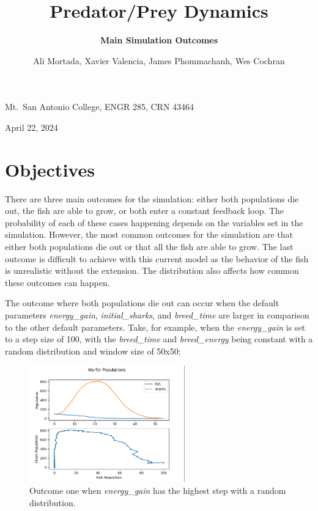 \documentclass[12pt]{iopart} %
\begin{document}
\title{Predator/Prey Dynamics}
\author{Ali Mortada, Xavier Valencia, James Phommachanh, Wes Cochran}
\vspace{10pt}
\begin{indented}
  \item[]Mt.~San Antonio College, ENGR 285, CRN 43464
  \item[]April 22, 2024
\end{indented}
\newpage

\section{Objectives}

\subtitle{\textbf{Main Simulation Outcomes}}

There are three main outcomes for the simulation: either both populations die out, the fish are able to grow, or both enter a constant feedback loop. 
The probability of each of these cases happening depends on the variables set in the simulation. 
However, the most common outcomes for the simulation are that either both populations die out or that all the fish are able to grow. 
The last outcome is difficult to achieve with this current model as the behavior of the fish is unrealistic without the extension. 
The distribution also affects how common these outcomes can happen.

The outcome where both populations die out can occur when the default parameters \emph{energy\_gain}, \emph{initial\_sharks}, and \emph{breed\_time} are larger in comparison to the other default parameters. 
Take, for example, when the \emph{energy\_gain} is set to a step size of 100, with the \emph{breed\_time} and \emph{breed\_energy} being constant with a random distribution and window size of 50x50:

\begin{figure}[h!tbp]
  \begin{center}
  \item[]\includegraphics[width=0.6\textwidth]{figure1.png}
  \caption{\label{fig:figure1}
  Outcome one when \emph{energy\_gain} has the highest step with a random distribution.
  }
  \end{center}
\end{figure}
\end{document}
